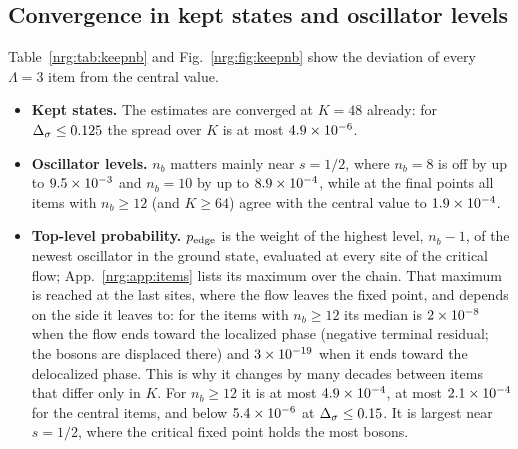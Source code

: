 \begin{table}[ht]\centering\scriptsize\setlength{\tabcolsep}{2.5pt}
\caption{The points without a plateau (central items). Settled value; plateau drift; change of the window $\DE$ per site at the settled
window; the three fitted $\Delta_\infty$ and $\omega$ for $S=30,25,20$; their median (the extrapolated value). At $\Ds=0.2$ and $0.175$
the median is the final value. Last column: the crossover fit of Sec.~\ref{nrg:sec:crosscheck} (median, number $n_{\rm fit}$ of accepted
fits), computed at $\Ds\ge0.2$ only; a cross-check, not adopted. $^\ast$Not converged in chain depth: cross-check only, not
used.}\label{nrg:tab:extrap}

\end{table}

\subsection{Convergence in kept states and oscillator levels}\label{nrg:sec:keepnb}
Table~\ref{nrg:tab:keepnb} and Fig.~\ref{nrg:fig:keepnb} show the deviation of every $\Lambda=3$ item from the central value.
\begin{itemize}
\item \textbf{Kept states.} The estimates are converged at $K=48$ already: for $\Delta_\sigma\le0.125$ the spread over $K$ is at most
  $4.9\times10^{-6}$.
\item \textbf{Oscillator levels.} $n_b$ matters mainly near $s=1/2$, where $n_b=8$ is off by up to $9.5\times10^{-3}$ and $n_b=10$ by up to
  $8.9\times10^{-4}$, while at the final points all items with $n_b\ge12$ (and $K\ge64$) agree with the central value to $1.9\times10^{-4}$.
\item \textbf{Top-level probability.} $p_{\rm edge}$ is the weight of the highest level, $n_b-1$, of the newest oscillator in the
  ground state, evaluated at every site of the critical flow; App.~\ref{nrg:app:items} lists its maximum over the chain. That maximum is
  reached at the last sites, where the flow leaves the fixed point, and depends on the side it leaves to: for the items with
  $n_b\ge12$ its median is $2\times10^{-8}$ when the flow ends toward the localized phase (negative terminal residual; the bosons are
  displaced there) and $3\times10^{-19}$ when it ends toward the delocalized phase. This is why it changes by many decades between
  items that differ only in $K$. For $n_b\ge12$ it is at most $4.9\times10^{-4}$, at most $2.1\times10^{-4}$ for the central items, and
  below $5.4\times10^{-6}$ at $\Delta_\sigma\le0.15$. It is largest near $s=1/2$, where the critical fixed point holds the most bosons.
\end{itemize}

